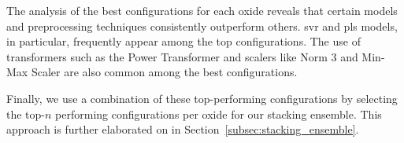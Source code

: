 The analysis of the best configurations for each oxide reveals that certain models and preprocessing techniques consistently outperform others. \gls{svr} and \gls{pls} models, in particular, frequently appear among the top configurations. The use of transformers such as the Power Transformer and scalers like Norm 3 and Min-Max Scaler are also common among the best configurations.

Finally, we use a combination of these top-performing configurations by selecting the top-$n$ performing configurations per oxide for our stacking ensemble.
This approach is further elaborated on in Section~\ref{subsec:stacking_ensemble}.